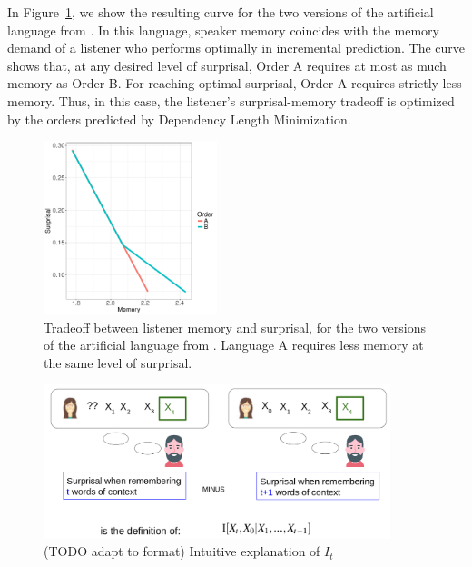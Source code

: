 \documentclass[11pt,letterpaper]{article}
\begin{document}
In Figure~\ref{fig:toy-listener-tradeoff}, we show the resulting curve for the two versions of the artificial language from \cite{fedzechkina-human-2017}.
In this language, speaker memory coincides with the memory demand of a listener who performs optimally in incremental prediction.
The curve shows that, at any desired level of surprisal, Order A requires at most as much memory as Order B.
For reaching optimal surprisal, Order A requires strictly less memory.
Thus, in this case, the listener's surprisal-memory tradeoff is optimized by the orders predicted by Dependency Length Minimization.

\begin{figure}
\includegraphics[width=0.45\textwidth]{toy/toy-mem-surp.pdf}
	\caption{Tradeoff between listener memory and surprisal, for the two versions of the artificial language from \cite{fedzechkina-human-2017}. Language A requires less memory at the same level of surprisal.}\label{fig:toy-listener-tradeoff}
\end{figure}





\begin{figure}
\includegraphics[width=0.9\textwidth]{figures/listener-it.png}
	\caption{(TODO adapt to format) Intuitive explanation of $I_t$}
\end{figure}
\end{document}
